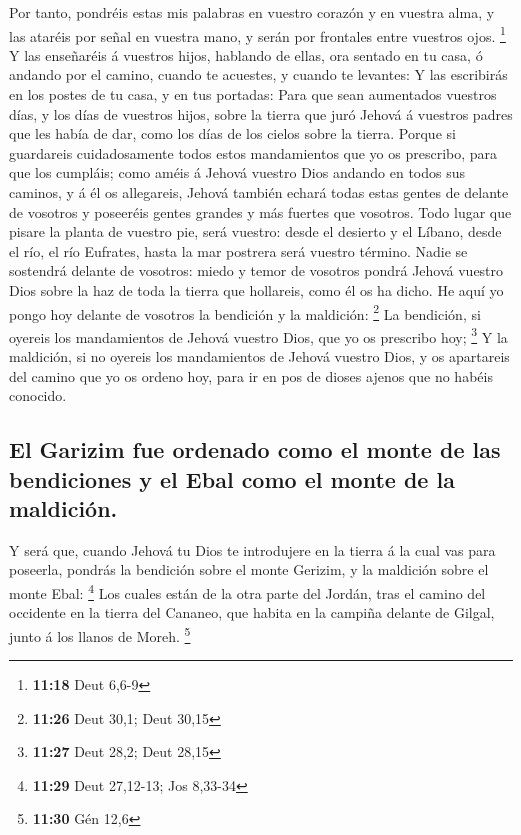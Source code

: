  Por tanto, pondréis estas mis palabras en vuestro corazón
y en vuestra alma, y las ataréis por señal en vuestra mano, y serán por
frontales entre vuestros ojos. \footnote{\textbf{11:18} Deut 6,6-9}
 Y las enseñaréis á vuestros hijos, hablando de ellas, ora
sentado en tu casa, ó andando por el camino, cuando te acuestes, y
cuando te levantes:  Y las escribirás en los postes de tu
casa, y en tus portadas:  Para que sean aumentados vuestros
días, y los días de vuestros hijos, sobre la tierra que juró Jehová á
vuestros padres que les había de dar, como los días de los cielos sobre
la tierra.  Porque si guardareis cuidadosamente todos estos
mandamientos que yo os prescribo, para que los cumpláis; como améis á
Jehová vuestro Dios andando en todos sus caminos, y á él os allegareis,
 Jehová también echará todas estas gentes de delante de
vosotros y poseeréis gentes grandes y más fuertes que vosotros.
 Todo lugar que pisare la planta de vuestro pie, será
vuestro: desde el desierto y el Líbano, desde el río, el río Eufrates,
hasta la mar postrera será vuestro término.  Nadie se
sostendrá delante de vosotros: miedo y temor de vosotros pondrá Jehová
vuestro Dios sobre la haz de toda la tierra que hollareis, como él os ha
dicho.  He aquí yo pongo hoy delante de vosotros la
bendición y la maldición: \footnote{\textbf{11:26} Deut 30,1; Deut 30,15}
 La bendición, si oyereis los mandamientos de Jehová
vuestro Dios, que yo os prescribo hoy; \footnote{\textbf{11:27} Deut
  28,2; Deut 28,15}  Y la maldición, si no oyereis los
mandamientos de Jehová vuestro Dios, y os apartareis del camino que yo
os ordeno hoy, para ir en pos de dioses ajenos que no habéis conocido.

\hypertarget{el-garizim-fue-ordenado-como-el-monte-de-las-bendiciones-y-el-ebal-como-el-monte-de-la-maldiciuxf3n.}{%
\subsection{El Garizim fue ordenado como el monte de las bendiciones y
el Ebal como el monte de la
maldición.}\label{el-garizim-fue-ordenado-como-el-monte-de-las-bendiciones-y-el-ebal-como-el-monte-de-la-maldiciuxf3n.}}

 Y será que, cuando Jehová tu Dios te introdujere en la
tierra á la cual vas para poseerla, pondrás la bendición sobre el monte
Gerizim, y la maldición sobre el monte Ebal: \footnote{\textbf{11:29}
  Deut 27,12-13; Jos 8,33-34}  Los cuales están de la otra
parte del Jordán, tras el camino del occidente en la tierra del Cananeo,
que habita en la campiña delante de Gilgal, junto á los llanos de Moreh.
\footnote{\textbf{11:30} Gén 12,6}

